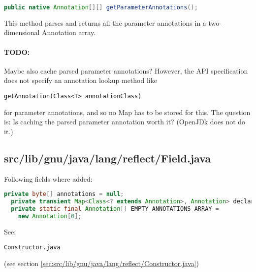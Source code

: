 \documentclass[a4paper, 10pt, titlepage]{scrartcl} %
\begin{document}
\begin{lstlisting}[language=Java,firstnumber=461]
  public native Annotation[][] getParameterAnnotations();
\end{lstlisting}
This method parses and returns all the parameter annotations in a
two-dimensional Annotation array.

\paragraph{TODO:}
\label{par:TODO/cache-parameter-annotations}Maybe also cache parsed parameter annotations? However, the
API specification does not specify an annotation lookup method like
\begin{scriptsize}\verb|getAnnotation|\hspace{0.0pt}\verb|(|\hspace{0.0pt}\verb|Class|\hspace{0.0pt}\verb|<|\hspace{0.0pt}\verb|T|\hspace{0.0pt}\verb|>|\hspace{0.0pt}\verb||\hspace{0.0pt}\verb| |\hspace{0.0pt}\verb|annotationClass|\hspace{0.0pt}\verb|)|\hspace{0.0pt}\verb||\end{scriptsize} for parameter annotations,
and so no Map has to be stored for this. The question is: Is caching the
parsed parameter annotation worth it? (OpenJDk does not do it.)

\subsection{src/lib/gnu/java/lang/reflect/Field.java}
\label{sec:src/lib/gnu/java/lang/reflect/Field.java}

Following fields where added:
\begin{lstlisting}[language=Java]
  private byte[] annotations = null;
  private transient Map<Class<? extends Annotation>, Annotation> declaredAnnotations = null;
  private static final Annotation[] EMPTY_ANNOTATIONS_ARRAY =
    new Annotation[0];
\end{lstlisting}
See: \begin{scriptsize}\verb|Constructor|\hspace{0.0pt}\verb|.|\hspace{0.0pt}\verb|java|\end{scriptsize} (see section \ref{sec:src/lib/gnu/java/lang/reflect/Constructor.java})
\end{document}
